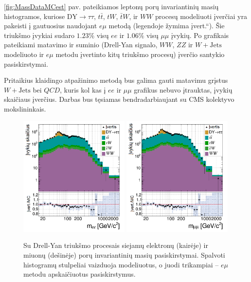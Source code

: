 \documentclass[a4paper, 12pt, oneside]{article}
\newcommand{\tbarW}{\bar{t}W}
\newcommand{\ttbar}{t\bar{t}}
\newcommand{\emu}{e\mu}
\newcommand{\WJets}{W\! +\!\mathrm{Jets}}
\newcommand{\DYtau}{\mathrm{DY} \! \rightarrow \! \tau\tau}
\newcommand{\ltq}[1]{{\quotedblbase{}#1\textquotedblleft{}}}
\newcommand{\QCD}{QC\! D}
\newlength\q
\begin{document}
\ref{fig:MassDataMCest} pav. pateikiamos leptonų porų invariantinių masių histogramos, kuriose $\DYtau$, $\ttbar$,
$tW$, $\tbarW$, ir $WW$ procesų modeliuoti įverčiai yra pakeisti į gautuosius naudojant $\emu$ metodą (legendoje žymima
\ltq{įvert.}).
Šie triukšmo įvykiai sudaro $1.23\%$ visų $ee$ ir $1.06\%$ visų $\mu\mu$ įvykių.
Po grafikais pateikiami matavimo ir suminio (Drell-Yan signalo, $WW$, $ZZ$ ir $W+\mathrm{Jets}$ modeliuoto ir 
$e\mu$ metodu įvertinto kitų triukšmo procesų) įverčio santykio pasiskirstymai.

Pritaikius klaidingo atpažinimo metodą bus galima gauti matavimu grįstus $\WJets$ bei $\QCD$, kuris kol kas į $ee$ ir $\mu\mu$ grafikus
nebuvo įtrauktas, įvykių skaičiaus įverčius.
Darbas bus tęsiamas bendradarbiaujant su CMS kolektyvo mokslininkais.

\begin{figure}[H]
	\includegraphics[width=0.49\textwidth]{ee_bkg_est.png}
	\includegraphics[width=0.49\textwidth]{mumu_bkg_est.png}
	\caption{\label{fig:bkgEst}
		Su Drell-Yan triukšmo procesais siejamų elektronų (kairėje) ir miuonų (dešinėje) porų invariantinių masių pasiskirstymai.
		Spalvoti histogramų stulpeliai vaizduoja modeliuotus, o juodi trikampiai -- $\emu$ metodu apskaičiuotus pasiskirstymus.}
\end{figure}
\end{document}
